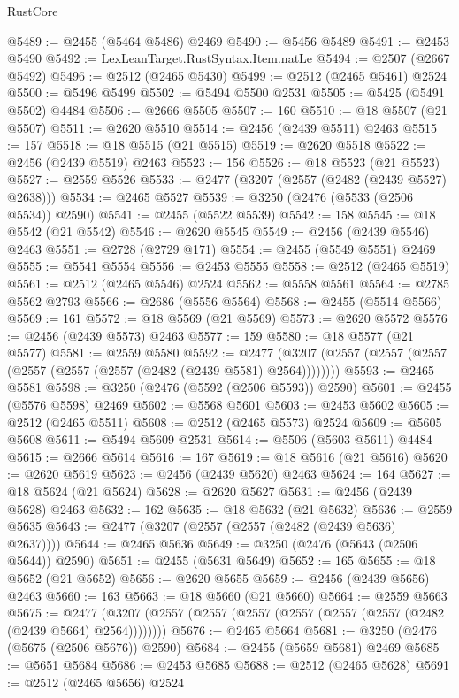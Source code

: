 \begin{lexlean}{RustCore}
\begin{coremodule}
@5489 := @2455 (@5464 @5486) @2469
@5490 := @5456 @5489
@5491 := @2453 @5490
@5492 := LexLeanTarget.RustSyntax.Item.natLe
@5494 := @2507 (@2667 @5492)
@5496 := @2512 (@2465 @5430)
@5499 := @2512 (@2465 @5461) @2524
@5500 := @5496 @5499
@5502 := @5494 @5500 @2531
@5505 := @5425 (@5491 @5502) @4484
@5506 := @2666 @5505
@5507 := 160
@5510 := @18 @5507 (@21 @5507)
@5511 := @2620 @5510
@5514 := @2456 (@2439 @5511) @2463
@5515 := 157
@5518 := @18 @5515 (@21 @5515)
@5519 := @2620 @5518
@5522 := @2456 (@2439 @5519) @2463
@5523 := 156
@5526 := @18 @5523 (@21 @5523)
@5527 := @2559 @5526
@5533 := @2477 (@3207 (@2557 (@2482 (@2439 @5527) @2638)))
@5534 := @2465 @5527
@5539 := @3250 (@2476 (@5533 (@2506 @5534)) @2590)
@5541 := @2455 (@5522 @5539)
@5542 := 158
@5545 := @18 @5542 (@21 @5542)
@5546 := @2620 @5545
@5549 := @2456 (@2439 @5546) @2463
@5551 := @2728 (@2729 @171)
@5554 := @2455 (@5549 @5551) @2469
@5555 := @5541 @5554
@5556 := @2453 @5555
@5558 := @2512 (@2465 @5519)
@5561 := @2512 (@2465 @5546) @2524
@5562 := @5558 @5561
@5564 := @2785 @5562 @2793
@5566 := @2686 (@5556 @5564)
@5568 := @2455 (@5514 @5566)
@5569 := 161
@5572 := @18 @5569 (@21 @5569)
@5573 := @2620 @5572
@5576 := @2456 (@2439 @5573) @2463
@5577 := 159
@5580 := @18 @5577 (@21 @5577)
@5581 := @2559 @5580
@5592 := @2477 (@3207 (@2557 (@2557 (@2557 (@2557 (@2557 (@2557 (@2482 (@2439 @5581) @2564))))))))
@5593 := @2465 @5581
@5598 := @3250 (@2476 (@5592 (@2506 @5593)) @2590)
@5601 := @2455 (@5576 @5598) @2469
@5602 := @5568 @5601
@5603 := @2453 @5602
@5605 := @2512 (@2465 @5511)
@5608 := @2512 (@2465 @5573) @2524
@5609 := @5605 @5608
@5611 := @5494 @5609 @2531
@5614 := @5506 (@5603 @5611) @4484
@5615 := @2666 @5614
@5616 := 167
@5619 := @18 @5616 (@21 @5616)
@5620 := @2620 @5619
@5623 := @2456 (@2439 @5620) @2463
@5624 := 164
@5627 := @18 @5624 (@21 @5624)
@5628 := @2620 @5627
@5631 := @2456 (@2439 @5628) @2463
@5632 := 162
@5635 := @18 @5632 (@21 @5632)
@5636 := @2559 @5635
@5643 := @2477 (@3207 (@2557 (@2557 (@2482 (@2439 @5636) @2637))))
@5644 := @2465 @5636
@5649 := @3250 (@2476 (@5643 (@2506 @5644)) @2590)
@5651 := @2455 (@5631 @5649)
@5652 := 165
@5655 := @18 @5652 (@21 @5652)
@5656 := @2620 @5655
@5659 := @2456 (@2439 @5656) @2463
@5660 := 163
@5663 := @18 @5660 (@21 @5660)
@5664 := @2559 @5663
@5675 := @2477 (@3207 (@2557 (@2557 (@2557 (@2557 (@2557 (@2557 (@2482 (@2439 @5664) @2564))))))))
@5676 := @2465 @5664
@5681 := @3250 (@2476 (@5675 (@2506 @5676)) @2590)
@5684 := @2455 (@5659 @5681) @2469
@5685 := @5651 @5684
@5686 := @2453 @5685
@5688 := @2512 (@2465 @5628)
@5691 := @2512 (@2465 @5656) @2524

\end{coremodule}
\end{lexlean}
